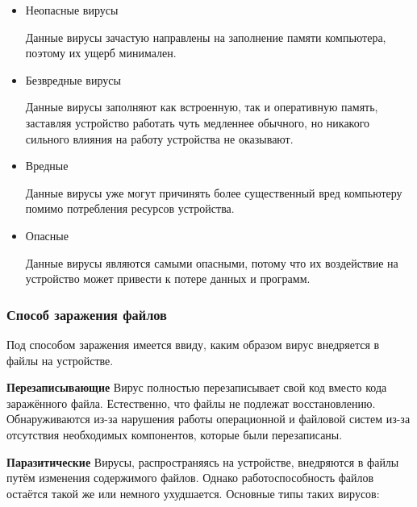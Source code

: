 \documentclass[12pt]{article}
\def\l{\linebreak}
\begin{document}
\begin{itemize}
    \item Неопасные вирусы
        \begin{flushleft}
        Данные вирусы зачастую направлены на заполнение памяти компьютера, поэтому их ущерб минимален.
        \end{flushleft}
    \item Безвредные вирусы
        \begin{flushleft}
        Данные вирусы заполняют как встроенную, так и оперативную память, заставляя устройство работать чуть медленнее обычного, но никакого сильного влияния на работу устройства не оказывают.
        \end{flushleft}
    \item Вредные
        \begin{flushleft}
            Данные вирусы уже могут причинять более существенный вред компьютеру помимо потребления ресурсов устройства.
        \end{flushleft}
    \item Опасные
        \begin{flushleft}
            Данные вирусы являются самыми опасными, потому что их воздействие на устройство может привести к потере данных и программ.
        \end{flushleft}
\end{itemize}

\subsubsection*{Способ заражения файлов}
Под способом заражения имеется ввиду, каким образом вирус внедряется в файлы на устройстве.

\textbf{Перезаписывающие} \l
Вирус полностью перезаписывает свой код вместо кода заражённого файла. Естественно, что файлы не подлежат восстановлению. Обнаруживаются из-за нарушения работы операционной и файловой систем из-за отсутствия необходимых компонентов, которые были перезаписаны.

\textbf{Паразитические} \l
Вирусы, распространяясь на устройстве, внедряются в файлы путём изменения содержимого файлов. Однако работоспособность файлов остаётся такой же или немного ухудшается. Основные типы таких вирусов:
\end{document}
